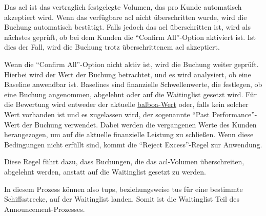 Das \gls{acl} ist das vertraglich festgelegte Volumen, das pro Kunde automatisch akzeptiert wird. Wenn das verfügbare \gls{acl} nicht überschritten wurde, wird die Buchung automatisch bestätigt. Falls jedoch das \gls{acl} überschritten ist, wird als nächstes geprüft, ob bei dem Kunden die \enquote{Confirm All}-Option aktiviert ist. Ist dies der Fall, wird die Buchung trotz überschrittenem \gls{acl} akzeptiert.

Wenn die \enquote{Confirm All}-Option nicht aktiv ist, wird die Buchung weiter geprüft. Hierbei wird der Wert der Buchung betrachtet, und es wird analysiert, ob eine Baseline anwendbar ist. Baselines sind finanzielle Schwellenwerte, die festlegen, ob eine Buchung angenommen, abgelehnt oder auf die Waitinglist gesetzt wird. Für die Bewertung wird entweder der aktuelle \hyperref[ref:balboa]{\gls{balboa}-Wert} oder, falls kein solcher Wert vorhanden ist und es zugelassen wird, der sogenannte \enquote{Past Performance}-Wert der Buchung verwendet.  
Dabei werden die vergangenen Werte des Kunden herangezogen, um auf die aktuelle finanzielle Leistung zu schließen.  
Wenn diese Bedingungen nicht erfüllt sind, kommt die \enquote{Reject Excess}-Regel zur Anwendung.

Diese Regel führt dazu, dass Buchungen, die das \gls{acl}-Volumen überschreiten, abgelehnt werden, anstatt auf die Waitinglist gesetzt zu werden.

In diesem Prozess können also \glspl{tup}, beziehungsweise \glspl{tu} für eine bestimmte Schiffsstrecke, auf der Waitinglist landen. Somit ist die Waitinglist Teil des Announcement-Prozesses.

